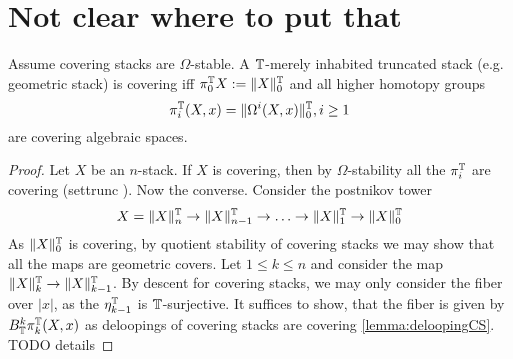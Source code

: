 \documentclass{article}
\begin{document}
\section{Not clear where to put that}
\begin{prop}
	Assume covering stacks are $\Omega$-stable.
	A $\mathbb{T}$-merely inhabited truncated stack (e.g. geometric stack) is covering iff $\pi_0^{\mathbb{T}} X := \|X\|_0^{\mathbb{T}}$ and all higher homotopy groups 
	\[
	\pi_i^{\mathbb{T}}(X,x) = \|\Omega^i (X , x)\|_0^{\mathbb{T}} , i \ge 1
	\]
	are covering algebraic spaces.
\end{prop}
\begin{proof}
	Let $X$ be an $n$-stack.
	If $X$ is covering, then by $\Omega$-stability all the $\pi_i^{\mathbb{T}}$ are covering (settrunc \todocite). Now the converse.
	Consider the postnikov tower
	\[
	X = \|X\|_n^{\mathbb{T}} \to \|X\|_{n-1}^{\mathbb{T}} \to \hdots \to \|X\|_1^{\mathbb{T}} \to \|X\|_0^{\mathbb{T}} 
	\]
	As $\|X\|_0^{\mathbb{T}}$ is covering, by quotient stability of covering stacks we may show that all the maps are geometric covers. 
	Let $1 \le k \le n$ and consider the map $\|X\|_{k}^{\mathbb{T}} \to \|X\|_{k-1}^{\mathbb{T}}$. By descent for covering stacks, we may only consider the fiber over $|x|$, as the $\eta_{k-1}^{\mathbb{T}}$ is $\mathbb{T}$-surjective. 
	It suffices to show, that the fiber is given by $B_{\mathbb{T}}^k \pi^{\mathbb{T}}_k(X,x)$ as deloopings of covering stacks are covering \ref{lemma:deloopingCS}.\\	
	TODO details		
\end{proof}
\end{document}
